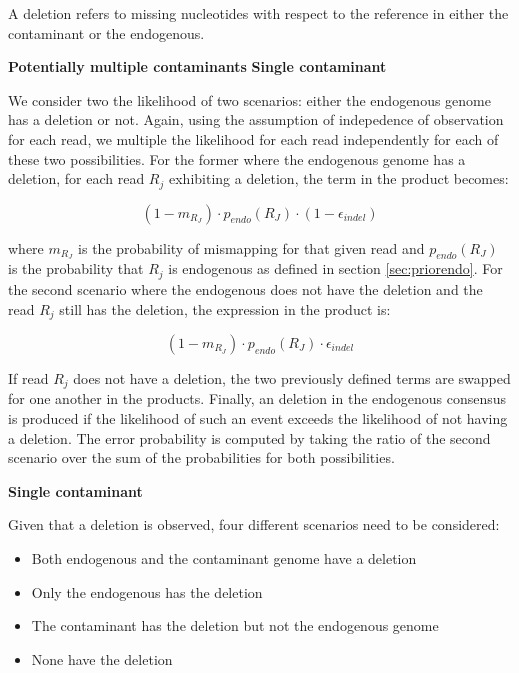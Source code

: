 \documentclass[a4paper,12pt]{article}
\begin{document}
{

A deletion refers to missing nucleotides with respect to the reference in either the contaminant or the endogenous.

{\bf Potentially multiple contaminants}
{\bf Single contaminant}

We consider two the likelihood of two scenarios: either the endogenous genome has a deletion or not. Again, using the assumption of indepedence of observation for each read, we multiple the likelihood for each read independently for each of these two possibilities. For the former where the endogenous genome has a deletion, for each read $R_j$ exhibiting a deletion, the term in the product becomes:

\begin{equation}
 (1-m_{R_J}) \cdot p_{endo}(R_J) \cdot (1-\epsilon_{indel})
\label{eqn:correctindel}
\end{equation}

\noindent where $m_{R_J}$ is the probability of mismapping for that given read and $p_{endo}(R_J)$ is the probability that $R_j$ is endogenous as defined in section \ref{sec:priorendo}. For the second scenario where the endogenous does not have the deletion and the read $R_j$ still has the deletion, the expression in the product is:

\begin{equation}
 (1-m_{R_J}) \cdot p_{endo}(R_J) \cdot \epsilon_{indel}
\label{eqn:incorrectindel}
\end{equation}

\noindent If read $R_j$ does not have a deletion, the two previously defined terms are swapped for one another in the products. Finally, an deletion in the endogenous consensus is produced if the likelihood of such an event exceeds the likelihood of not having a deletion. The error probability is computed by taking the ratio of the second scenario over the sum of the probabilities for both possibilities.

{\bf Single contaminant}

Given that a deletion is observed, four different scenarios need to be considered:

\begin{itemize}
\item Both endogenous and the contaminant genome have a deletion
\item Only the endogenous has the deletion
\item The contaminant has the deletion but not the endogenous genome
\item None have the deletion
\end{itemize}

}
\end{document}
